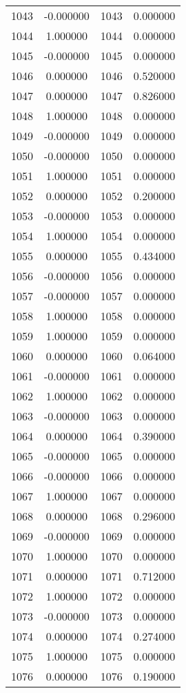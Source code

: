 \documentclass[12pt]{article}
\begin{document}
\begin{longtable}{@{}cccc@{}}
1043 & -0.000000 & 1043 & 0.000000 \\
1044 & 1.000000 & 1044 & 0.000000 \\
1045 & -0.000000 & 1045 & 0.000000 \\
1046 & 0.000000 & 1046 & 0.520000 \\
1047 & 0.000000 & 1047 & 0.826000 \\
1048 & 1.000000 & 1048 & 0.000000 \\
1049 & -0.000000 & 1049 & 0.000000 \\
1050 & -0.000000 & 1050 & 0.000000 \\
1051 & 1.000000 & 1051 & 0.000000 \\
1052 & 0.000000 & 1052 & 0.200000 \\
1053 & -0.000000 & 1053 & 0.000000 \\
1054 & 1.000000 & 1054 & 0.000000 \\
1055 & 0.000000 & 1055 & 0.434000 \\
1056 & -0.000000 & 1056 & 0.000000 \\
1057 & -0.000000 & 1057 & 0.000000 \\
1058 & 1.000000 & 1058 & 0.000000 \\
1059 & 1.000000 & 1059 & 0.000000 \\
1060 & 0.000000 & 1060 & 0.064000 \\
1061 & -0.000000 & 1061 & 0.000000 \\
1062 & 1.000000 & 1062 & 0.000000 \\
1063 & -0.000000 & 1063 & 0.000000 \\
1064 & 0.000000 & 1064 & 0.390000 \\
1065 & -0.000000 & 1065 & 0.000000 \\
1066 & -0.000000 & 1066 & 0.000000 \\
1067 & 1.000000 & 1067 & 0.000000 \\
1068 & 0.000000 & 1068 & 0.296000 \\
1069 & -0.000000 & 1069 & 0.000000 \\
1070 & 1.000000 & 1070 & 0.000000 \\
1071 & 0.000000 & 1071 & 0.712000 \\
1072 & 1.000000 & 1072 & 0.000000 \\
1073 & -0.000000 & 1073 & 0.000000 \\
1074 & 0.000000 & 1074 & 0.274000 \\
1075 & 1.000000 & 1075 & 0.000000 \\
1076 & 0.000000 & 1076 & 0.190000 \\

\end{longtable}
\end{document}
